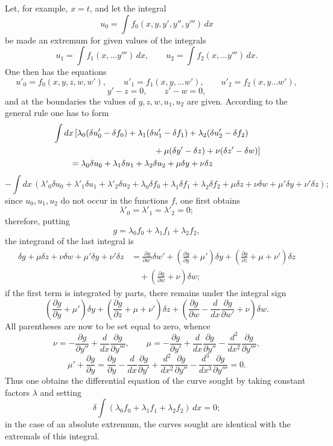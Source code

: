 \documentclass[11pt,a4paper,leqno]{article}
\begin{document}
Let, for example, $x=t$, and let the integral
\[
u_0=\int f_0(x,y,y',y'',y''')\,dx
\]
be made an extremum for given values of the integrals
\[
u_1=\int f_1(x,\ldots y''')\,dx,\qquad
u_2=\int f_2(x,\ldots y''')\,dx.
\]
One then has the equations
\[
u'_0=f_0(x,y,z,w,w'),\qquad
u'_1=f_1(x,y,\ldots w'),\qquad
u'_2=f_2(x,y\ldots w'),
\]
\[
y'-z=0,\qquad z'-w=0,
\]
and at the boundaries the values of $y,z,w,u_1,u_2$ are given. According to the general rule one has to form
\[
\begin{aligned}
&\int dx\,[\lambda_0(\delta u'_0-\delta f_0)
+\lambda_1(\delta u'_1-\delta f_1)
+\lambda_2(\delta u'_2-\delta f_2)\\
&\hspace{42mm}+\mu(\delta y'-\delta z)+\nu(\delta z'-\delta w)]\\
&\qquad=\lambda_0\delta u_0+\lambda_1\delta u_1+\lambda_2\delta u_2+\mu\delta y+\nu\delta z
\end{aligned}
\]
\[
-\int dx\,(\lambda'_0\delta u_0+\lambda'_1\delta u_1+\lambda'_2\delta u_2
+\lambda_0\delta f_0+\lambda_1\delta f_1+\lambda_2\delta f_2
+\mu\delta z+\nu\delta w+\mu'\delta y+\nu'\delta z);
\]
since $u_0,u_1,u_2$ do not occur in the functions $f$, one first obtains
\[
\lambda'_0=\lambda'_1=\lambda'_2=0;
\]
therefore, putting
\[
g=\lambda_0f_0+\lambda_1f_1+\lambda_2f_2,
\]
the integrand of the last integral is
\[
\begin{aligned}
\delta g+\mu\delta z+\nu\delta w+\mu'\delta y+\nu'\delta z
&=\frac{\partial g}{\partial w'}\delta w'
+\left(\frac{\partial g}{\partial y}+\mu'\right)\delta y
+\left(\frac{\partial g}{\partial z}+\mu+\nu'\right)\delta z\\
&\quad+\left(\frac{\partial g}{\partial w}+\nu\right)\delta w;
\end{aligned}
\]
if the first term is integrated by parts, there remains under the integral sign
\[
\left(\frac{\partial g}{\partial y}+\mu'\right)\delta y
+\left(\frac{\partial g}{\partial z}+\mu+\nu'\right)\delta z
+\left(\frac{\partial g}{\partial w}-\frac{d}{dx}\frac{\partial g}{\partial w'}+\nu\right)\delta w.
\]
All parentheses are now to be set equal to zero, whence
\[
\nu=-\frac{\partial g}{\partial y''}+\frac{d}{dx}\frac{\partial g}{\partial y'''},\qquad
\mu=-\frac{\partial g}{\partial y'}+\frac{d}{dx}\frac{\partial g}{\partial y''}
-\frac{d^2}{dx^2}\frac{\partial g}{\partial y'''},
\]
\[
\mu'+\frac{\partial g}{\partial y}
=\frac{\partial g}{\partial y}-\frac{d}{dx}\frac{\partial g}{\partial y'}
+\frac{d^2}{dx^2}\frac{\partial g}{\partial y''}
-\frac{d^3}{dx^3}\frac{\partial g}{\partial y'''}=0.
\]
Thus one obtains the differential equation of the curve sought by taking constant factors $\lambda$ and setting
\[
\delta\int(\lambda_0f_0+\lambda_1f_1+\lambda_2f_2)\,dx=0;
\]
in the case of an absolute extremum, the curves sought are identical with the extremals of this integral.
\end{document}
